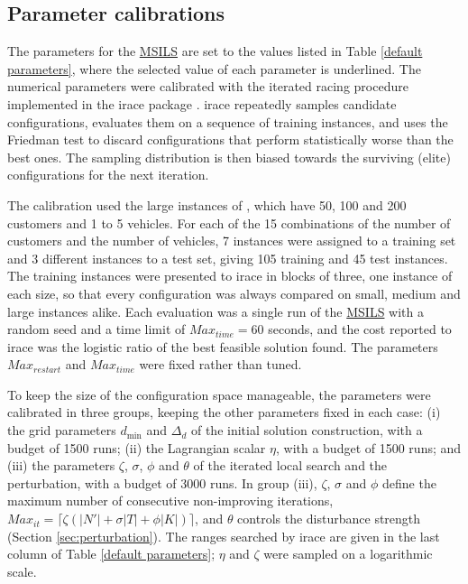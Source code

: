 \documentclass{article}
\begin{document}
\subsection{Parameter calibrations}


The parameters for the \hyperref[alg:MSILS]{MSILS} are set to the values listed in Table \ref{default parameters}, where the selected value of each parameter is underlined. The numerical parameters were calibrated with the iterated racing procedure implemented in the irace package \citep{lopez2016irace}. irace repeatedly samples candidate configurations, evaluates them on a sequence of training instances, and uses the Friedman test to discard configurations that perform statistically worse than the best ones. The sampling distribution is then biased towards the surviving (elite) configurations for the next iteration.

The calibration used the large instances of \cite{archetti2012hybrid}, which have 50, 100 and 200 customers and 1 to 5 vehicles. For each of the 15 combinations of the number of customers and the number of vehicles, 7 instances were assigned to a training set and 3 different instances to a test set, giving 105 training and 45 test instances. The training instances were presented to irace in blocks of three, one instance of each size, so that every configuration was always compared on small, medium and large instances alike. Each evaluation was a single run of the \hyperref[alg:MSILS]{MSILS} with a random seed and a time limit of $Max_{time}=60$ seconds, and the cost reported to irace was the logistic ratio of the best feasible solution found. The parameters $Max_{restart}$ and $Max_{time}$ were fixed rather than tuned.

To keep the size of the configuration space manageable, the parameters were calibrated in three groups, keeping the other parameters fixed in each case: (i) the grid parameters $d_{\min}$ and $\Delta_d$ of the initial solution construction, with a budget of 1500 runs; (ii) the Lagrangian scalar $\eta$, with a budget of 1500 runs; and (iii) the parameters $\zeta$, $\sigma$, $\phi$ and $\theta$ of the iterated local search and the perturbation, with a budget of 3000 runs. In group (iii), $\zeta$, $\sigma$ and $\phi$ define the maximum number of consecutive non-improving iterations, $Max_{it}=\lceil \zeta(|N'|+\sigma|T|+\phi|K|)\rceil$, and $\theta$ controls the disturbance strength (Section \ref{sec:perturbation}). The ranges searched by irace are given in the last column of Table \ref{default parameters}; $\eta$ and $\zeta$ were sampled on a logarithmic scale.
\end{document}
